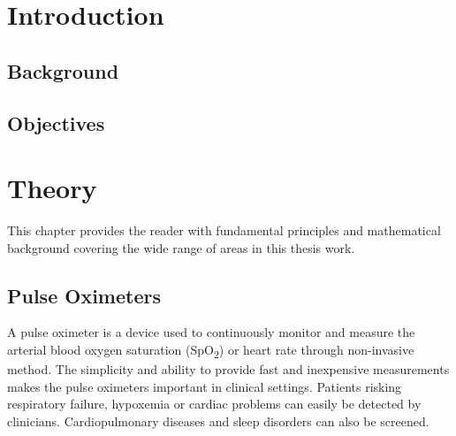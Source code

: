 \documentclass{report}
\begin{document}
\chapter{Introduction}

 \vspace{-0.6cm}
\section{Background}
 


\section{Objectives}



\chapter{Theory}

 \vspace{-0.6cm}

This chapter provides the reader with fundamental principles and mathematical background covering the wide range of areas in this thesis work.


\section{Pulse Oximeters}


A pulse oximeter is a device used to continuously monitor and measure the arterial blood oxygen saturation (SpO\textsubscript{2}) or heart rate through non-invasive method. The simplicity and ability to provide fast and inexpensive measurements makes the pulse oximeters important in clinical settings. Patients risking respiratory failure, hypoxemia or cardiac problems can easily be detected by clinicians. Cardiopulmonary diseases and sleep disorders can also be screened. 
 
\end{document}
